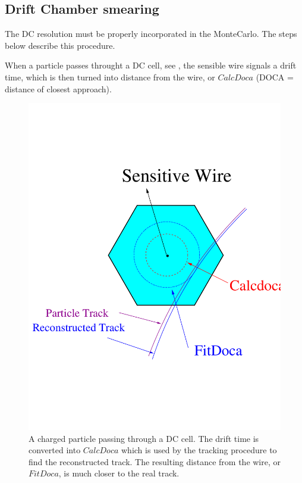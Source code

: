 \subsection{Drift Chamber smearing}
The DC resolution must be properly incorporated in the MonteCarlo. The steps below describe this procedure.

When a particle passes throught a DC cell, see , the sensible wire signals a drift time, which is then turned 
into distance from the wire, or $CalcDoca$ (DOCA = distance of closest approach).

\begin{figure}[h]
 \begin{center}
 \includegraphics[width = 12cm, bb=-60 140 700 700]{acceptance/img/dc_cell} 
  \caption[A charged particle passing through a DC cell]
          { A charged particle passing through a DC cell. The drift time is converted into $CalcDoca$ which
	             is used by the tracking procedure to find the reconstructed track. The resulting distance
		     from the wire, or $FitDoca$, is much closer to the real track. }
 \label{fig:dc_cell}
 \end{center}
\end{figure}


